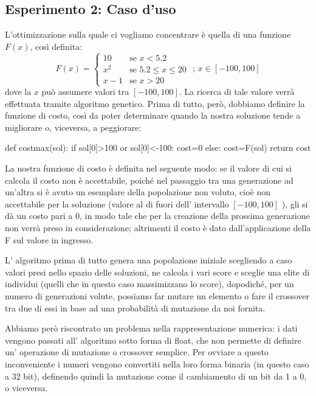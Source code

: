 		\subsection{Esperimento 2: Caso d'uso}
			L'ottimizzazione sulla quale ci vogliamo concentrare è quella di una funzione $F(x)$, così definita:
			\[
				F(x)=
				\begin{cases}
					10 & \mbox{se }x<5.2\\
					x^2 & \mbox{se }5.2\leq x \leq 20\\
					x-1 & \mbox{se } x>20
				\end{cases}
				\mbox{ ; }x \in [-100,100]
			\]
			dove la $x$ può assumere valori tra $[-100,100]$. La ricerca di tale valore verrà effettuata tramite algoritmo genetico. Prima di tutto, però, dobbiamo definire la funzione di costo, così da poter determinare quando la nostra soluzione tende a migliorare o, viceversa, a peggiorare:
			\bigskip
			\begin{python}
		def costmax(sol):
			if sol[0]>100 or sol[0]<-100:
				cost=0
			else:
				cost=F(sol)
		return cost  
			\end{python}
			\bigskip
			La nostra funzione di costo è definita nel seguente modo: se il valore di cui si calcola il costo non è accettabile, poiché nel passaggio tra una generazione ad un'altra si è avuto un esemplare della popolazione non voluto, cioè non accettabile per la soluzione (valore al di fuori dell' intervallo $[-100,100]$ ), gli si dà un costo pari a 0, in modo tale che per la creazione della prossima generazione non verrà preso in considerazione; altrimenti il costo è dato dall'applicazione della F sul valore in ingresso.\par
			L' algoritmo prima di tutto genera una popolazione iniziale scegliendo a caso valori presi nello spazio delle soluzioni, ne calcola i vari score e sceglie una elite di individui (quelli che in questo caso massimizzano lo score), dopodiché, per un numero di generazioni volute, possiamo far mutare un elemento o fare il crossover tra due di essi in base ad una probabilità di mutazione da noi fornita. \par 
			Abbiamo però riscontrato un problema nella rappresentazione numerica: i dati vengono passati all' algoritmo sotto forma di float, che non permette di definire un' operazione di mutazione o crossover semplice. Per ovviare a questo inconveniente i numeri vengono convertiti nella loro forma binaria (in questo caso a 32 bit), definendo quindi la mutazione come il cambiamento di un bit da 1 a 0, o viceversa.\par
